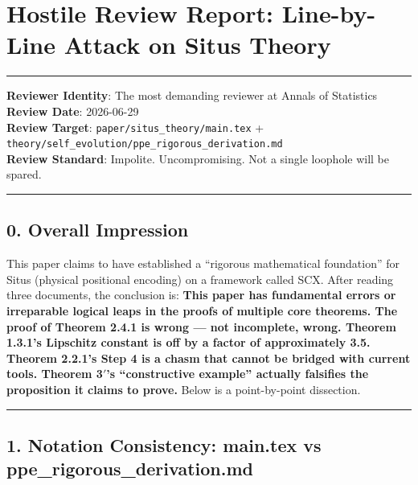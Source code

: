 \documentclass[
  12pt,
]{article}
\author{SCX}
\date{2026}
\begin{document}
\section{Hostile Review Report: Line-by-Line Attack on Situs Theory}\label{hostile-review-report-situs-theory}

\begin{center}\rule{0.5\linewidth}{0.5pt}\end{center}

\textbf{Reviewer Identity}: The most demanding reviewer at Annals of Statistics\\
\textbf{Review Date}: 2026-06-29\\
\textbf{Review Target}: \texttt{paper/situs\_theory/main.tex} + \texttt{theory/self\_evolution/ppe\_rigorous\_derivation.md}\\
\textbf{Review Standard}: Impolite. Uncompromising. Not a single loophole will be spared.

\begin{center}\rule{0.5\linewidth}{0.5pt}\end{center}

\subsection{0. Overall Impression}\label{overall-impression}

This paper claims to have established a ``rigorous mathematical foundation'' for Situs (physical positional encoding) on a framework called SCX. After reading three documents, the conclusion is: \textbf{This paper has fundamental errors or irreparable logical leaps in the proofs of multiple core theorems. The proof of Theorem 2.4.1 is wrong --- not incomplete, wrong. Theorem 1.3.1's Lipschitz constant is off by a factor of approximately 3.5. Theorem 2.2.1's Step 4 is a chasm that cannot be bridged with current tools. Theorem 3$'$'s ``constructive example'' actually falsifies the proposition it claims to prove.} Below is a point-by-point dissection.

\begin{center}\rule{0.5\linewidth}{0.5pt}\end{center}

\subsection{1. Notation Consistency: main.tex vs ppe\_rigorous\_derivation.md}\label{notation-consistency}
\end{document}
